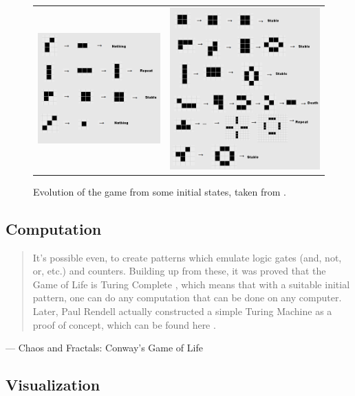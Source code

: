 \documentclass[addpoints]{exam}
\begin{document}
\begin{figure}[!h]
  \centering
  \begin{tabular}{cc}
    \includegraphics[width=.48\textwidth]{pattern1}
    & \includegraphics[width=.48\textwidth]{pattern2}
  \end{tabular}
  \caption{Evolution of the game from some initial states, taken from \cite{chaos}.}
\end{figure}


\subsection{Computation}
\begin{quotation}
  It's possible even, to create patterns which emulate logic gates (and, not, or, etc.) and counters. Building up from these, it was proved that the Game of Life is Turing Complete \cite{wp_turing}, which means that with a suitable initial pattern, one can do any computation that can be done on any computer. Later, Paul Rendell actually constructed a simple Turing Machine as a proof of concept, which can be found here \cite{gol_turing}.
\end{quotation}
\raggedleft --- Chaos and Fractals: Conway's Game of Life \cite{chaos}
\justify

\subsection{Visualization}
\end{document}
